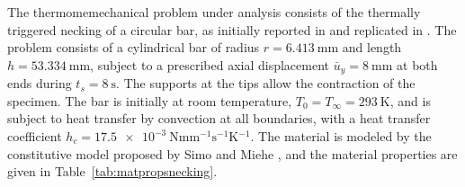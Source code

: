      The thermomemechanical problem under analysis consists of the thermally triggered necking of a circular bar, as initially reported in \cite{simo_associative_1992} and replicated in \cite{danowski_computational_2014}.
     The problem consists of a cylindrical bar of radius $r=\SI{6.413}{\milli\meter}$ and length $h=\SI{53.334}{\milli\meter}$, subject to a prescribed axial displacement $\bar{u}_{y}=\SI{8}{\milli\meter}$ at both ends during $t_s=\SI{8}{\second}$.
     The supports at the tips allow the contraction of the specimen.
     The bar is initially at room temperature, $T_{0}=T_{\infty}=\SI{293}{\kelvin}$, and is subject to heat transfer by convection at all boundaries, with a heat transfer coefficient $h_{c} = \SI{17.5e-3}{\newton\milli\meter^{-1}\second^{-1}\kelvin^{-1}}$.
     The material is modeled by the constitutive model proposed by Simo and Miehe \citep{simo_associative_1992}, and the material properties are given in Table~\ref{tab:matpropsnecking}.
